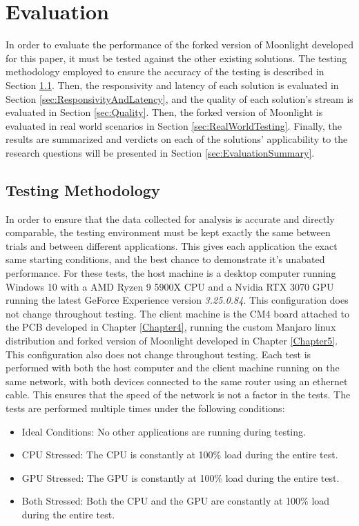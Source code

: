 \chapter{Evaluation}

\label{Chapter6}

In order to evaluate the performance of the forked version of Moonlight developed for this paper, it must be tested against the other existing solutions.
The testing methodology employed to ensure the accuracy of the testing is described in Section \ref{sec:TestingMethodology}.
Then, the responsivity and latency of each solution is evaluated in Section \ref{sec:ResponsivityAndLatency}, and the quality of each solution's stream is evaluated in Section \ref{sec:Quality}.
Then, the forked version of Moonlight is evaluated in real world scenarios in Section \ref{sec:RealWorldTesting}.
Finally, the results are summarized and verdicts on each of the solutions' applicability to the research questions will be presented in Section \ref{sec:EvaluationSummary}.


\section{Testing Methodology}\label{sec:TestingMethodology}

In order to ensure that the data collected for analysis is accurate and directly comparable, the testing environment must be kept exactly the same between trials and between different applications.
This gives each application the exact same starting conditions, and the best chance to demonstrate it's unabated performance.
For these tests, the host machine is a desktop computer running Windows 10 with a AMD Ryzen 9 5900X CPU and a Nvidia RTX 3070 GPU running the latest GeForce Experience version \emph{3.25.0.84}.
This configuration does not change throughout testing.
The client machine is the CM4 board attached to the PCB developed in Chapter \ref{Chapter4}, running the custom Manjaro linux distribution and forked version of Moonlight developed in Chapter \ref{Chapter5}.
This configuration also does not change throughout testing.
Each test is performed with both the host computer and the client machine running on the same network, with both devices connected to the same router using an ethernet cable.
This ensures that the speed of the network is not a factor in the tests.
The tests are performed multiple times under the following conditions:

\begin{itemize}
  \item Ideal Conditions: No other applications are running during testing.
  \item CPU Stressed: The CPU is constantly at 100\% load during the entire test.
  \item GPU Stressed: The GPU is constantly at 100\% load during the entire test.
  \item Both Stressed: Both the CPU and the GPU are constantly at 100\% load during the entire test.
\end{itemize}

